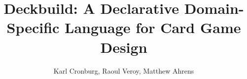\documentclass[color = usenames]{beamer}
\title{Deckbuild: A Declarative Domain-Specific Language for Card Game Design}
\author{Karl Cronburg, Raoul Veroy, Matthew Ahrens}
\institute{Tufts University}
\date{}
\begin{document}
\frame{\titlepage}














\end{document}
